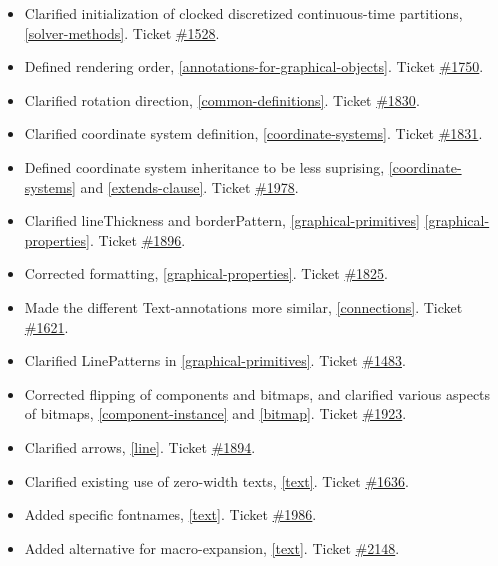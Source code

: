 \documentclass[10pt,a4paper]{report}
\begin{document}
\begin{itemize}
\item
  Clarified initialization of clocked discretized continuous-time
  partitions, \ref{solver-methods}. Ticket
  \href{https://trac.modelica.org/Modelica/ticket/1528}{\#1528}.
\item
  Defined rendering order, \ref{annotations-for-graphical-objects}. Ticket
  \href{https://trac.modelica.org/Modelica/ticket/1750}{\#1750}.
\item
  Clarified rotation direction, \ref{common-definitions}. Ticket
  \href{https://trac.modelica.org/Modelica/ticket/1830}{\#1830}.
\item
  Clarified coordinate system definition, \ref{coordinate-systems}. Ticket
  \href{https://trac.modelica.org/Modelica/ticket/1831}{\#1831}.
\item
  Defined coordinate system inheritance to be less suprising, 
  \ref{coordinate-systems} and \ref{extends-clause}. Ticket
  \href{https://trac.modelica.org/Modelica/ticket/1978}{\#1978}.
\item
  Clarified lineThickness and borderPattern, \ref{graphical-primitives} \ref{graphical-properties}.
  Ticket \href{https://trac.modelica.org/Modelica/ticket/1896}{\#1896}.
\item
  Corrected formatting, \ref{graphical-properties}. Ticket
  \href{https://trac.modelica.org/Modelica/ticket/1825}{\#1825}.
\item
  Made the different Text-annotations more similar, \ref{connections}.
  Ticket \href{https://trac.modelica.org/Modelica/ticket/1621}{\#1621}.
\item
  Clarified LinePatterns in \ref{graphical-primitives}. Ticket
  \href{https://trac.modelica.org/Modelica/ticket/1483}{\#1483}.
\item
  Corrected flipping of components and bitmaps, and clarified various
  aspects of bitmaps, \ref{component-instance} and \ref{bitmap}. Ticket
  \href{https://trac.modelica.org/Modelica/ticket/1923}{\#1923}.
\item
  Clarified arrows, \ref{line}. Ticket
  \href{https://trac.modelica.org/Modelica/ticket/1894}{\#1894}.
\item
  Clarified existing use of zero-width texts, \ref{text}. Ticket
  \href{https://trac.modelica.org/Modelica/ticket/1636}{\#1636}.
\item
  Added specific fontnames, \ref{text}. Ticket
  \href{https://trac.modelica.org/Modelica/ticket/1986}{\#1986}.
\item
  Added alternative for macro-expansion, \ref{text}. Ticket
  \href{https://trac.modelica.org/Modelica/ticket/2148}{\#2148}.

\end{itemize}
\end{document}
